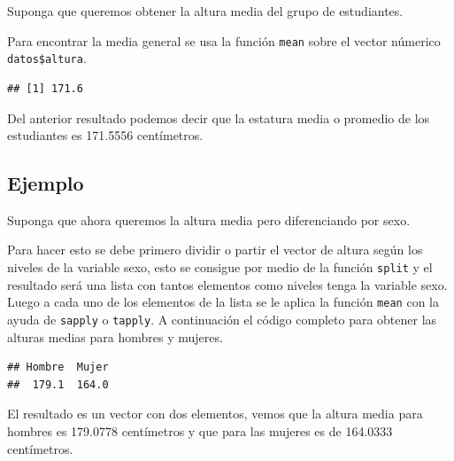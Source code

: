 \documentclass[10pt,]{krantz}
\makeatletter
\newenvironment{Shaded}{\begin{snugshade}}{\end{snugshade}}
\newcommand{\KeywordTok}[1]{\textcolor[rgb]{0.13,0.29,0.53}{\textbf{{#1}}}}
\newcommand{\DataTypeTok}[1]{\textcolor[rgb]{0.13,0.29,0.53}{{#1}}}
\newcommand{\NormalTok}[1]{{#1}}
\newenvironment{kframe}{%
\medskip{}
\setlength{\fboxsep}{.8em}
 \def\at@end@of@kframe{}%
 \ifinner\ifhmode%
  \def\at@end@of@kframe{\end{minipage}}%
  \begin{minipage}{\columnwidth}%
 \fi\fi%
 \def\FrameCommand##1{\hskip\@totalleftmargin \hskip-\fboxsep
 \colorbox{shadecolor}{##1}\hskip-\fboxsep
     \hskip-\linewidth \hskip-\@totalleftmargin \hskip\columnwidth}%
 \MakeFramed {\advance\hsize-\width
   \@totalleftmargin\z@ \linewidth\hsize
   \@setminipage}}%
 {\par\unskip\endMakeFramed%
 \at@end@of@kframe}
\renewenvironment{Shaded}{\begin{kframe}}{\end{kframe}}
\makeatother
\begin{document}
Suponga que queremos obtener la altura media del grupo de estudiantes.

Para encontrar la media general se usa la función \texttt{mean} sobre el
vector númerico \texttt{datos\$altura}.

\begin{Shaded}
\end{Shaded}

\begin{verbatim}
## [1] 171.6
\end{verbatim}

Del anterior resultado podemos decir que la estatura media o promedio de
los estudiantes es 171.5556 centímetros.

\subsection*{Ejemplo}\label{ejemplo-31}


Suponga que ahora queremos la altura media pero diferenciando por sexo.

Para hacer esto se debe primero dividir o partir el vector de altura
según los niveles de la variable sexo, esto se consigue por medio de la
función \texttt{split} y el resultado será una lista con tantos
elementos como niveles tenga la variable sexo. Luego a cada uno de los
elementos de la lista se le aplica la función \texttt{mean} con la ayuda
de \texttt{sapply} o \texttt{tapply}. A continuación el código completo
para obtener las alturas medias para hombres y mujeres.

\begin{Shaded}
\end{Shaded}

\begin{verbatim}
## Hombre  Mujer 
##  179.1  164.0
\end{verbatim}

El resultado es un vector con dos elementos, vemos que la altura media
para hombres es 179.0778 centímetros y que para las mujeres es de
164.0333 centímetros.
\end{document}
